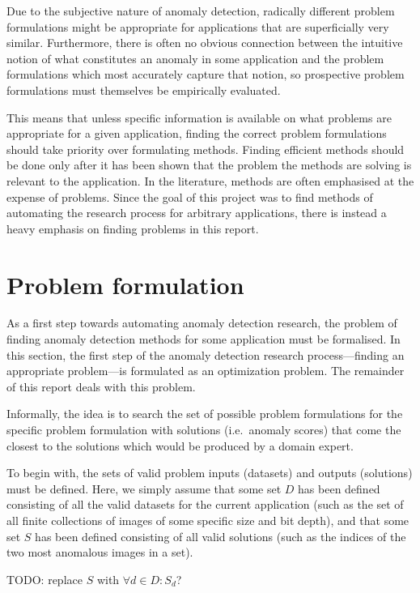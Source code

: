 Due to the subjective nature of anomaly detection, radically different problem formulations might be appropriate for applications that are superficially very similar. Furthermore, there is often no obvious connection between the intuitive notion of what constitutes an anomaly in some application and the problem formulations which most accurately capture that notion, so prospective problem formulations must themselves be empirically evaluated.

This means that unless specific information is available on what problems are appropriate for a given application, finding the correct problem formulations should take priority over formulating methods. Finding efficient methods should be done only after it has been shown that the problem the methods are solving is relevant to the application. In the literature, methods are often emphasised at the expense of problems. Since the goal of this project was to find methods of automating the research process for arbitrary applications, there is instead a heavy emphasis on finding problems in this report. 

\section{Problem formulation}
\label{sect:problem_formulation}
As a first step towards automating anomaly detection research, the problem of finding anomaly detection methods for some application must be formalised. In this section, the first step of the anomaly detection research process---finding an appropriate problem---is formulated as an optimization problem. The remainder of this report deals with this problem.

Informally, the idea is to search the set of possible problem formulations for the specific problem formulation with solutions (i.e.\ anomaly scores) that come the closest to the solutions which would be produced by a domain expert.

To begin with, the sets of valid problem inputs (datasets) and outputs (solutions) must be defined. Here, we simply assume that some set $D$ has been defined consisting of all the valid datasets for the current application (such as the set of all finite collections of images of some specific size and bit depth), and that some set $S$ has been defined consisting of all valid solutions (such as the indices of the two most anomalous images in a set).

TODO: replace $S$ with $\forall d \in D: S_d$?

